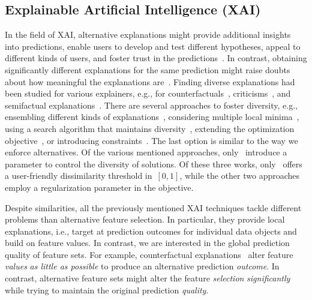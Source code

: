 \documentclass{article}
\theoremstyle{definition}
\begin{document}
\subsection{Explainable Artificial Intelligence (XAI)}
\label{sec:afs:related-work:xai}

In the field of XAI, alternative explanations might provide additional insights into predictions, enable users to develop and test different hypotheses, appeal to different kinds of users, and foster trust in the predictions~\cite{kim2021multi, wang2019designing}.
In contrast, obtaining significantly different explanations for the same prediction might raise doubts about how meaningful the explanations are~\cite{jain2019attention}.
Finding diverse explanations had been studied for various explainers, e.g., for counterfactuals~\cite{dandl2020multi, karimi2020model, mohammadi2021scaling, mothilal2020explaining, russell2019efficient, wachter2017counterfactual}, criticisms~\cite{kim2016examples}, and semifactual explanations~\cite{artelt2022even}.
There are several approaches to foster diversity, e.g., ensembling different kinds of explanations~\cite{silva2019produce}, considering multiple local minima~\cite{wachter2017counterfactual}, using a search algorithm that maintains diversity~\cite{dandl2020multi}, extending the optimization objective~\cite{artelt2022even, kim2016examples, mothilal2020explaining}, or introducing constraints~\cite{karimi2020model, mohammadi2021scaling, russell2019efficient}.
The last option is similar to the way we enforce alternatives.
Of the various mentioned approaches, only~\cite{artelt2022even, mohammadi2021scaling, mothilal2020explaining} introduce a parameter to control the diversity of solutions.
Of these three works, only~\cite{mohammadi2021scaling} offers a user-friendly dissimilarity threshold in~$[0,1]$, while the other two approaches employ a regularization parameter in the objective.

Despite similarities, all the previously mentioned XAI techniques tackle different problems than alternative feature selection.
In particular, they provide local explanations, i.e., target at prediction outcomes for individual data objects and build on feature values.
In contrast, we are interested in the global prediction quality of feature sets.
For example, counterfactual explanations~\cite{guidotti2022counterfactual, stepin2021survey, verma2020counterfactual} alter feature \emph{values} \emph{as little as possible} to produce an alternative prediction \emph{outcome}.
In contrast, alternative feature sets might alter the feature \emph{selection} \emph{significantly} while trying to maintain the original prediction \emph{quality}.
\end{document}
